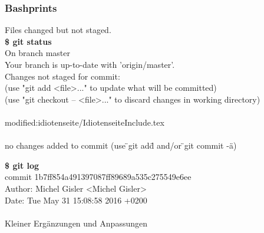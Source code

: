 \subsubsection{Bashprints}
\begin{multicols}{2}
	\begin{minipage}[l]{.40\textwidth}
		Files changed but not staged.\\    
		\textbf{\$ git status}\\
		On branch master\\
		Your branch is up-to-date with 'origin/master'.\\
		Changes not staged for commit:\\
		\quad (use "git add <file>..." to update what will be committed)\\
		\quad (use "git checkout -- <file>..." to discard changes in working directory)\\
		\\
		\qquad modified:\quad idiotenseite/IdiotenseiteInclude.tex\\
		\\
		no changes added to commit \newline (use \"{}git add\"{} and/or \"{}git commit -a\"{})\\
	\end{minipage}
	
	\begin{minipage}[r]{.40\textwidth}
		\textbf{\$ git log}\\
		commit 1b7ff854a491397087ff89689a535c275549e6ee\\
		Author: \quad Michel Gisler <Michel Gisler>\\
		Date:  \quad  Tue May 31 15:08:58 2016 +0200\\
		\\  
		\qquad Kleiner Ergänzungen und Anpassungen\\
	\end{minipage}
\end{multicols}
\clearpage
\pagebreak
